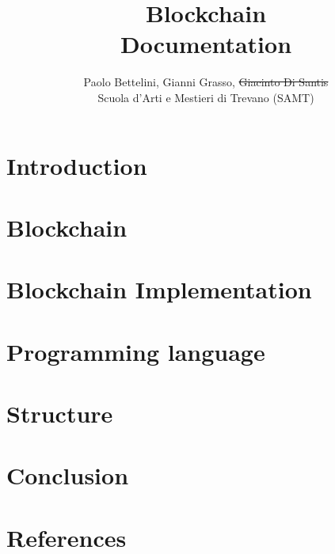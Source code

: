 \documentclass{article}
\title{
    Blockchain \\
    \large Documentation}
\author{
    Paolo Bettelini, Gianni Grasso, \sout{Giacinto Di Santis} \\
    \large Scuola d'Arti e Mestieri di Trevano (SAMT)}
\date{}
\begin{document}
\maketitle

\pagebreak

\tableofcontents

\pagebreak

\section{Introduction}



\pagebreak

\section{Blockchain}



\pagebreak

\section{Blockchain Implementation}



\pagebreak

\section{Programming language}



\pagebreak

\section{Structure}



\pagebreak

\section{Conclusion}



\pagebreak

\section{References}
\end{document}
